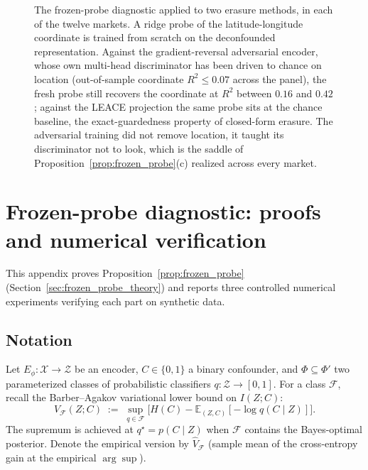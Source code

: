 \documentclass{article}
\begin{document}
\begin{figure}[H]
\caption{The frozen-probe diagnostic applied to two erasure methods, in each of the
twelve markets. A ridge probe of the latitude-longitude coordinate is trained from
scratch on the deconfounded representation. Against the gradient-reversal
adversarial encoder, whose own multi-head discriminator has been driven to chance
on location (out-of-sample coordinate $R^2 \le 0.07$ across the panel), the fresh
probe still recovers the coordinate at $R^2$ between $0.16$ and $0.42$; against the
LEACE projection the same probe sits at the chance baseline, the exact-guardedness
property of closed-form erasure. The adversarial training did not remove location,
it taught its discriminator not to look, which is the saddle of
Proposition~\ref{prop:frozen_probe}(c) realized across every market.}
\label{fig:grl-foil}
\end{figure}

\section{Frozen-probe diagnostic: proofs and numerical verification}
\label{app:frozen_probe_proofs}

This appendix proves Proposition~\ref{prop:frozen_probe} (Section~\ref{sec:frozen_probe_theory}) and reports three controlled numerical experiments verifying each part on synthetic data.

\subsection{Notation}

Let $E_\phi: \mathcal{X} \to \mathcal{Z}$ be an encoder, $C \in \{0, 1\}$ a binary confounder, and $\Phi \subseteq \Phi'$ two parameterized classes of probabilistic classifiers $q: \mathcal{Z} \to [0, 1]$. For a class $\mathcal{F}$, recall the Barber--Agakov variational lower bound on $I(Z; C)$:
\begin{equation}
V_{\mathcal{F}}(Z; C) \;:=\; \sup_{q \in \mathcal{F}} \big[H(C) - \mathbb{E}_{(Z,C)}[-\log q(C \mid Z)]\big].
\end{equation}
The supremum is achieved at $q^\star = p(C \mid Z)$ when $\mathcal{F}$ contains the Bayes-optimal posterior. Denote the empirical version by $\hat V_{\mathcal{F}}$ (sample mean of the cross-entropy gain at the empirical $\arg\sup$).
\end{document}
